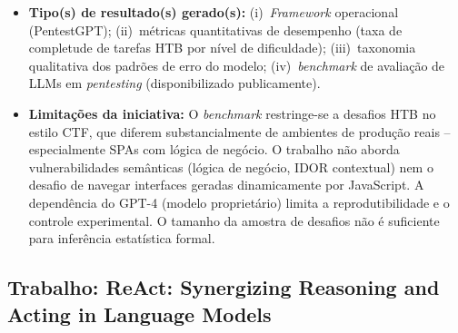 \documentclass[12pt, a4paper]{article}
\begin{document}
\begin{itemize}
\begin{itemize}
    \item[(f)] \textbf{Tipo(s) de resultado(s) gerado(s):}
    (i)~\textit{Framework} operacional (PentestGPT);
    (ii)~métricas quantitativas de desempenho (taxa de completude de tarefas HTB por nível de dificuldade);
    (iii)~taxonomia qualitativa dos padrões de erro do modelo;
    (iv)~\textit{benchmark} de avaliação de LLMs em \textit{pentesting} (disponibilizado publicamente).

    \item[(g)] \textbf{Limitações da iniciativa:}
    O \textit{benchmark} restringe-se a desafios HTB no estilo CTF, que diferem substancialmente de ambientes de produção reais -- especialmente SPAs com lógica de negócio.
    O trabalho não aborda vulnerabilidades semânticas (lógica de negócio, IDOR contextual) nem o desafio de navegar interfaces geradas dinamicamente por JavaScript.
    A dependência do GPT-4 (modelo proprietário) limita a reprodutibilidade e o controle experimental.
    O tamanho da amostra de desafios não é suficiente para inferência estatística formal.

  \end{itemize}
\end{itemize}

\subsection{Trabalho: ReAct: Synergizing Reasoning and Acting in Language Models}
\end{document}
